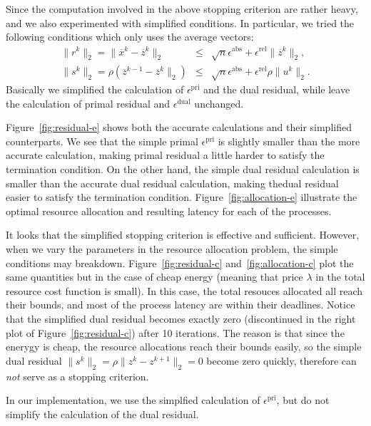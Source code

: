 Since the computation involved in the above stopping criterion are 
rather heavy, and we also experimented with simplified conditions.
In particular, we tried the following conditions 
which only uses the average vectors:
\begin{eqnarray*}
\|r^k\|_2=\|\overline x^k - \overline z^k\|_2 
&\leq& \sqrt{n}\epsilon^\mathrm{abs}+\epsilon^\mathrm{rel}\|\overline z^k\|_2,\\
\|s^k\|_2 = \rho(\overline z^{k-1}-\overline z^k\|_2)
&\leq& \sqrt{n}\epsilon^\mathrm{abs} +\epsilon^\mathrm{rel}\rho \|u^k\|_2 .
\end{eqnarray*}
Basically we simplified the calculation of $\epsilon^\mathrm{pri}$ and
the dual residual, while leave the calculation of primal residual and
$\epsilon^\mathrm{dual}$ unchanged.

Figure~\ref{fig:residual-e} shows both the accurate calculations and their
simplified counterparts.
We see that the simple primal $\epsilon^\mathrm{pri}$ is slightly smaller
than the more accurate calculation, making primal residual a little harder to
satisfy the termination condition. 
On the other hand, the simple dual residual calculation is smaller than
the accurate dual residual calculation, making thedual residual easier to
satisfy the termination condition.
Figure~\ref{fig:allocation-e} illustrate the optimal resource allocation 
and resulting latency for each of the processes.

It looks that the simplified stopping criterion is effective and 
sufficient.
However, when we vary the parameters in the resource allocation problem, 
the simple conditions may breakdown.
Figure~\ref{fig:residual-c} and~\ref{fig:allocation-c} 
plot the same quantities but in the case of cheap energy (meaning that
price $\lambda$ in the total resource cost function is small).
In this case, the total resouces allocated all reach their bounds, 
and most of the process latency are within their deadlines.
Notice that the simplified dual residual becomes exactly zero 
(discontinued in the right plot of Figure~\ref{fig:residual-c}) 
after 10 iterations.
The reason is that since the enerygy is cheap, the resource allocations 
reach their bounds easily,
so the simple dual residual $\|s^k\|_2=\rho\|z^{k}-z^{k+1}\|_2=0$ 
become zero quickly, therefore can \emph{not} serve as a stopping criterion.

In our implementation, we use the simplfied calculation of 
$\epsilon^\mathrm{pri}$,
but do not simplify the calculation of the dual residual.

